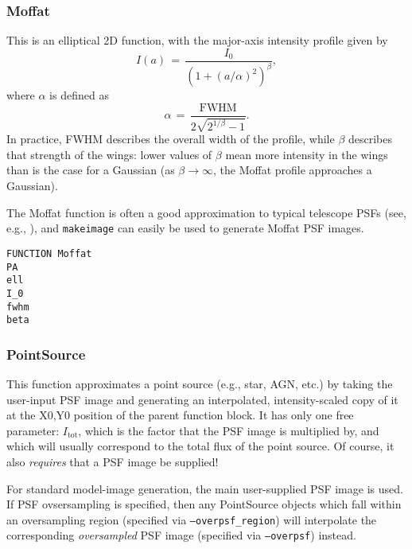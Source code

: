 \documentclass[10pt,a4paper,article]{memoir}
\newcommand{\makeimage}{\texttt{makeimage}}
\begin{document}
\subsubsection{Moffat}

This is an elliptical 2D \citet{moffat69} function, with the major-axis intensity profile
given by
\begin{equation}
I(a) \, = \, \frac{I_{0}  }{(1 + (a/\alpha)^{2})^{\beta} },
\end{equation}
where $\alpha$ is defined as
\begin{equation}
\alpha \, = \, \frac{ {\mathrm{FWHM}}}{2 \sqrt{2^{1/\beta} - 1}}.
\end{equation}
In practice, FWHM describes the overall width of the profile, while $\beta$ describes that
strength of the wings: lower values of $\beta$ mean more intensity in the wings
than is the case for a Gaussian (as $\beta \rightarrow \infty$, the Moffat profile
approaches a Gaussian).

The Moffat function is often a good approximation to typical telescope PSFs (see, e.g.,
\citealt{trujillo01}), and \makeimage{} can easily be used to generate Moffat PSF images.

\begin{verbatim}
FUNCTION Moffat
PA
ell
I_0
fwhm
beta
\end{verbatim}


%


\subsubsection{PointSource}

This function approximates a point source (e.g., star, AGN, etc.) by
taking the user-input PSF image and generating an interpolated,
intensity-scaled copy of it at the X0,Y0 position of the parent function
block. It has only one free parameter: $I_{\mathrm{tot}}$, which is the
factor that the PSF image is multiplied by, and which will usually
correspond to the total flux of the point source. Of course, it also
\textit{requires} that a PSF image be supplied!

For standard model-image generation, the main user-supplied PSF image is
used. If PSF ovsersampling is specified, then any PointSource objects
which fall within an oversampling region (specified via
\texttt{--overpsf\_region}) will interpolate the corresponding
\textit{oversampled} PSF image (specified via \texttt{--overpsf}) instead.
\end{document}
